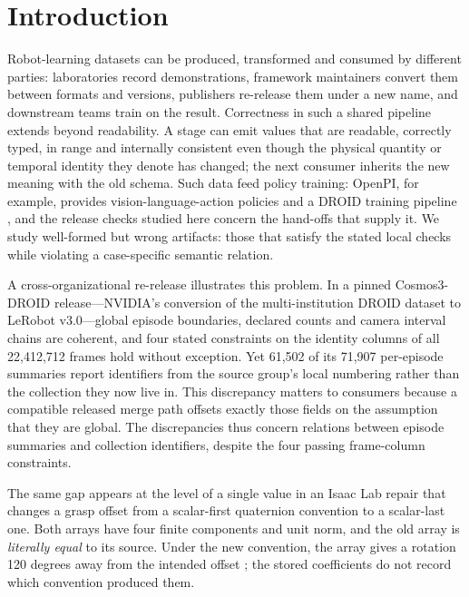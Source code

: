 \documentclass[conference]{IEEEtran}
\begin{document}
\section{Introduction}

Robot-learning datasets can be produced, transformed and consumed by different parties: laboratories record demonstrations, framework maintainers convert them between formats and versions, publishers re-release them under a new name, and downstream teams train on the result. Correctness in such a shared pipeline extends beyond readability. A stage can emit values that are readable, correctly typed, in range and internally consistent even though the physical quantity or temporal identity they denote has changed; the next consumer inherits the new meaning with the old schema. Such data feed policy training: OpenPI, for example, provides vision-language-action policies and a DROID training pipeline \cite{26}, and the release checks studied here concern the hand-offs that supply it. We study well-formed but wrong artifacts: those that satisfy the stated local checks while violating a case-specific semantic relation.\par

A cross-organizational re-release illustrates this problem. In a pinned Cosmos3-DROID release---NVIDIA's conversion of the multi-institution DROID dataset to LeRobot v3.0---global episode boundaries, declared counts and camera interval chains are coherent, and four stated constraints on the identity columns of all 22,412,712 frames hold without exception. Yet 61,502 of its 71,907 per-episode summaries report identifiers from the source group's local numbering rather than the collection they now live in. This discrepancy matters to consumers because a compatible released merge path offsets exactly those fields on the assumption that they are global. The discrepancies thus concern relations between episode summaries and collection identifiers, despite the four passing frame-column constraints.\par

The same gap appears at the level of a single value in an Isaac Lab repair that changes a grasp offset from a scalar-first quaternion convention to a scalar-last one. Both arrays have four finite components and unit norm, and the old array is \textit{literally equal} to its source. Under the new convention, the array gives a rotation 120 degrees away from the intended offset \cite{1}; the stored coefficients do not record which convention produced them.\par
\end{document}
